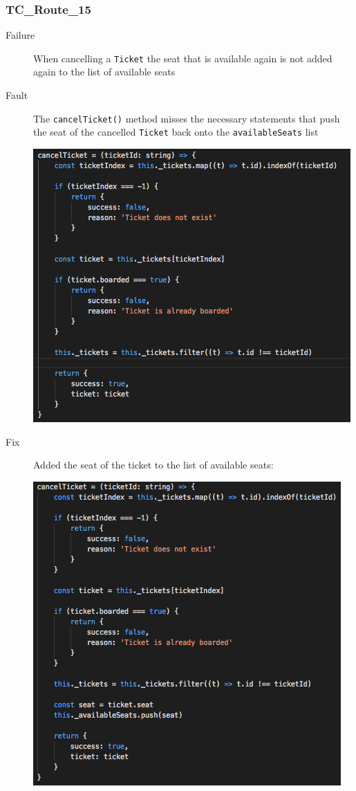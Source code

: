 \documentclass[11pt]{article}
\begin{document}
\subsubsection{TC\_Route\_15}
\label{sec:org337cb0f}

\begin{description}
\item[{Failure}] When cancelling a \texttt{Ticket} the seat that is available again is not added again to the list of available seats
\item[{Fault}] The \texttt{cancelTicket()} method misses the necessary statements that push the seat of the cancelled \texttt{Ticket} back onto the \texttt{availableSeats} list
\begin{center}
\includegraphics[width=.9\linewidth]{./Iteration2.rtfd/Pasted Graphic 2.tiff.png}
\end{center}
\item[{Fix}] Added the seat of the ticket to the list of available seats:
\begin{center}
\includegraphics[width=.9\linewidth]{./Iteration2.rtfd/1_Pasted Graphic 3.tiff.png}
\end{center}
\end{description}
\end{document}
